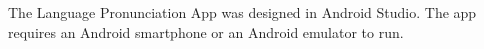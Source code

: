 The Language Pronunciation App was designed in Android Studio. The app requires an Android smartphone or an Android emulator to run.
